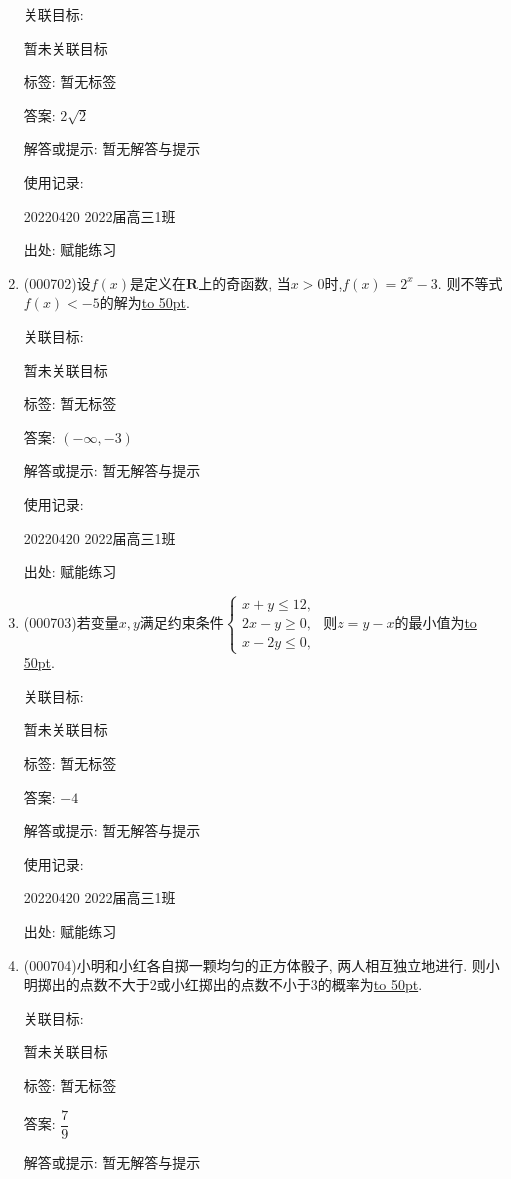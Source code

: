\documentclass[10pt,a4paper]{article}
\newcommand{\blank}[1]{\underline{\hbox to #1pt{}}}
\begin{document}
\begin{enumerate}[1.]
关联目标:

暂未关联目标



标签: 暂无标签

答案: $2\sqrt 2$

解答或提示: 暂无解答与提示

使用记录:

20220420	2022届高三1班	


出处: 赋能练习
\item { (000702)}设$f(x)$是定义在$\mathbf{R}$上的奇函数, 当$x>0$时,$f(x)=2^x-3$. 则不等式$f(x)<-5$的解为\blank{50}.


关联目标:

暂未关联目标



标签: 暂无标签

答案: $(-\infty,-3)$

解答或提示: 暂无解答与提示

使用记录:

20220420	2022届高三1班	


出处: 赋能练习
\item { (000703)}若变量$x,y$满足约束条件$\begin{cases} x+y\le 12, \\ 2x-y\ge 0,  \\ x-2y\le 0, \end{cases}$ 则$z=y-x$的最小值为\blank{50}.


关联目标:

暂未关联目标



标签: 暂无标签

答案: $-4$

解答或提示: 暂无解答与提示

使用记录:

20220420	2022届高三1班	


出处: 赋能练习
\item { (000704)}小明和小红各自掷一颗均匀的正方体骰子, 两人相互独立地进行. 则小明掷出的点数不大于$2$或小红掷出的点数不小于$3$的概率为\blank{50}.


关联目标:

暂未关联目标



标签: 暂无标签

答案: $\dfrac 79$

解答或提示: 暂无解答与提示


\end{enumerate}
\end{document}
